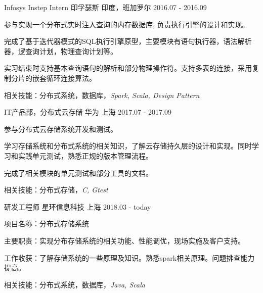 \begin{cventries}
  \cventry
    {Infosys Instep Intern}
    {印孚瑟斯}
    {印度，班加罗尔}
    {2016.07 - 2016.09}
    {
      \begin{cvitems}
        \item {参与实现一个分布式实时注入查询的内存数据库, 负责执行引擎的设计和实现。}
        \item {完成了基于迭代器模式的SQL执行引擎原型，主要模块有语句执行器，语法解析器，逻查询计划，物理查询计划等。}
        \item {实习结束时支持基本查询语句的解析和部分物理操作符。支持多表的连接，采用复制分片的嵌套循环连接算法。}
        \item {相关技能：分布式系统，数据库，\it{Spark, Scala, Design Pattern}}
      \end{cvitems}
    }
  \cventry
    {IT产品部，分布式云存储}
    {华为}
    {上海}
    {2017.07 - 2017.09}
    {
      \begin{cvitems}
        \item {参与分布式云存储系统开发和测试。}
        \item {学习存储系统和分布式系统的相关知识，了解云存储持久层的设计和实现。同时学习和实践单元测试，熟悉正规的版本管理流程。}
	\item {完成了相关模块的单元测试和部分工具的文档。}
        \item {相关技能：分布式存储，\it{C, Gtest}}
      \end{cvitems}
    }
\end{cventries}

\begin{cventries}
  \cventry
    {研发工程师}
    {星环信息科技}
    {上海}
    {2018.03 - today}
    {
      \begin{cvitems}
        \item {项目名称：分布式存储系统}
        \item {主要职责：实现分布存储系统的相关功能、性能调优，现场实施及客户支持。}
        \item {工作收获：了解存储系统的一些原理及知识。熟悉spark相关原理。问题排查能力提高。}
        \item {相关技能：分布式系统，数据库，\it{Java, Scala}}
      \end{cvitems}
    }
\end{cventries}

